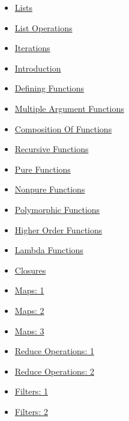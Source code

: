 \begin{itemize}
    \item \href{https://pythontutor.com/visualize.html#mode=edit}{Lists}
    \item \href{https://pythontutor.com/visualize.html#mode=edit}{List Operations}
    \item \href{https://pythontutor.com/visualize.html#mode=edit}{Iterations}
    \item \href{https://pythontutor.com/visualize.html#mode=display}{Introduction}
    \item \href{https://pythontutor.com/visualize.html#mode=display}{Defining Functions}
    \item \href{https://pythontutor.com/visualize.html#mode=edit}{Multiple Argument Functions}
    \item \href{https://pythontutor.com/visualize.html#mode=edit}{Composition Of Functions}
    \item \href{https://pythontutor.com/visualize.html#mode=edit}{Recursive Functions}
    \item \href{https://pythontutor.com/visualize.html#mode=edit}{Pure Functions}
    \item \href{https://pythontutor.com/visualize.html#mode=edit}{Nonpure Functions}
    \item \href{https://pythontutor.com/visualize.html#mode=edit}{Polymorphic Functions}
    \item \href{https://pythontutor.com/visualize.html#mode=edit}{Higher Order Functions}
    \item \href{https://pythontutor.com/visualize.html#mode=edit}{Lambda Functions}
    \item \href{https://pythontutor.com/visualize.html#mode=edit}{Closures}
    \item \href{https://pythontutor.com/visualize.html#mode=edit}{Maps: 1}
    \item \href{https://pythontutor.com/visualize.html#mode=edit}{Maps: 2}
    \item \href{https://pythontutor.com/visualize.html#mode=edit}{Maps: 3}
    \item \href{https://pythontutor.com/visualize.html#mode=edit}{Reduce Operations: 1}
    \item \href{https://pythontutor.com/visualize.html#mode=edit}{Reduce Operations: 2}
    \item \href{https://pythontutor.com/visualize.html#mode=edit}{Filters: 1}
    \item \href{https://pythontutor.com/visualize.html#mode=edit}{Filters: 2}
\end{itemize}


